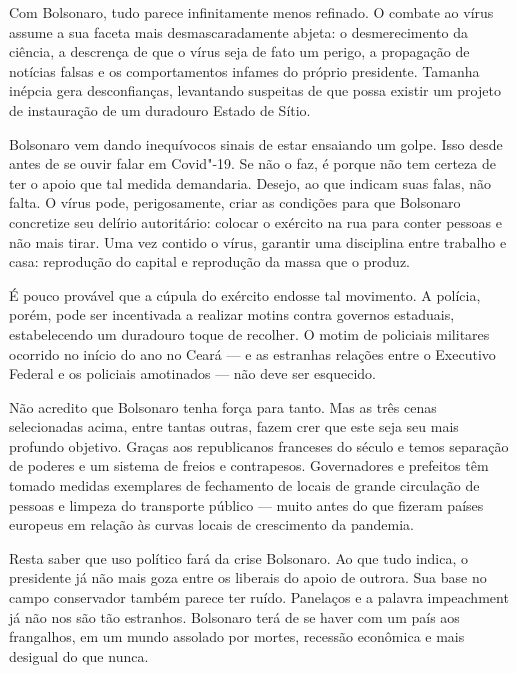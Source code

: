 Com Bolsonaro, tudo parece infinitamente menos refinado. O combate ao
vírus assume a sua faceta mais desmascaradamente abjeta: o
desmerecimento da ciência, a descrença de que o vírus seja de fato um
perigo, a propagação de notícias falsas e os comportamentos infames do
próprio presidente. Tamanha inépcia gera desconfianças, levantando
suspeitas de que possa existir um projeto de instauração de um duradouro
Estado de Sítio.

Bolsonaro vem dando inequívocos sinais de estar ensaiando um golpe. Isso
desde antes de se ouvir falar em Covid"-19. Se não o faz, é porque não
tem certeza de ter o apoio que tal medida demandaria. Desejo, ao que
indicam suas falas, não falta. O vírus pode, perigosamente, criar as
condições para que Bolsonaro concretize seu delírio autoritário: colocar
o exército na rua para conter pessoas e não mais tirar. Uma vez contido
o vírus, garantir uma disciplina entre trabalho e casa: reprodução do
capital e reprodução da massa que o produz.

É pouco provável que a cúpula do exército endosse tal movimento. A
polícia, porém, pode ser incentivada a realizar motins contra governos
estaduais, estabelecendo um duradouro toque de recolher. O motim de
policiais militares ocorrido no início do ano no Ceará --- e as estranhas
relações entre o Executivo Federal e os policiais amotinados --- não deve
ser esquecido.

Não acredito que Bolsonaro tenha força para tanto. Mas as três cenas
selecionadas acima, entre tantas outras, fazem crer que este seja seu
mais profundo objetivo. Graças aos republicanos franceses do século
 e  temos separação de poderes e um sistema de freios e
contrapesos. Governadores e prefeitos têm tomado medidas exemplares de
fechamento de locais de grande circulação de pessoas e limpeza do
transporte público --- muito antes do que fizeram países europeus em
relação às curvas locais de crescimento da pandemia.

Resta saber que uso político fará da crise Bolsonaro. Ao que tudo
indica, o presidente já não mais goza entre os liberais do apoio de
outrora. Sua base no campo conservador também parece ter ruído.
Panelaços e a palavra impeachment já não nos são tão estranhos.
Bolsonaro terá de se haver com um país aos frangalhos, em um mundo
assolado por mortes, recessão econômica e mais desigual do que nunca.

\section*{ \vspace*{-.1cm}\break{}}

